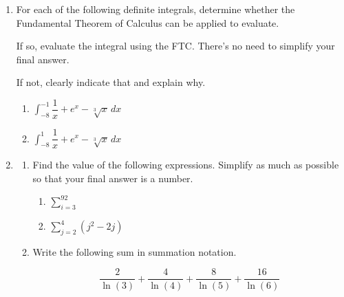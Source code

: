 \documentclass[11pt]{article}
\begin{document}
\begin{enumerate}
\item For each of the following definite integrals, determine whether the Fundamental Theorem of Calculus can be applied to evaluate. 

If so, evaluate the integral using the FTC. There's no need to simplify your final answer.

If not, clearly indicate that and explain why.

\begin{enumerate}
    \item $\displaystyle\int_{-8}^{-1}\dfrac{1}{x}+e^x-\sqrt[3]{x}\, dx$

    \vfill

    \item $\displaystyle\int_{-8}^1\dfrac{1}{x}+e^x-\sqrt[3]{x}\, dx$

    \vfill
\end{enumerate}


\newpage


\item 

\begin{enumerate}
    \item Find the value of the following expressions. Simplify as much as possible so that your final answer is a number.

    \begin{enumerate}
        \item[(i)] $\displaystyle\sum_{i=3}^92$

        \vfill

        \item[(ii)] $\displaystyle\sum_{j=2}^4(j^2-2j)$

        \vfill
    \end{enumerate}

    \item Write the following sum in summation notation. 

    \[\dfrac{2}{\ln(3)}+\dfrac{4}{\ln(4)}+\dfrac{8}{\ln(5)}+\dfrac{16}{\ln(6)}\]

    \vfill
\end{enumerate}


\end{enumerate}
\end{document}
